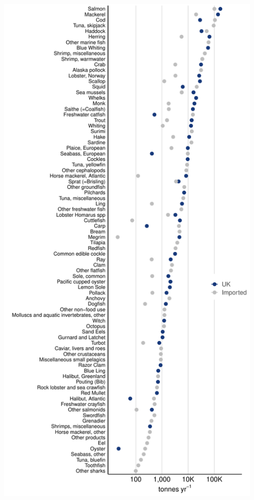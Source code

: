 \documentclass[
]{article}
\begin{document}
\newpage

\begin{center}\includegraphics[height=0.8\textheight]{fig/final/FigureS2_UK_seafood} \end{center}
\end{document}
